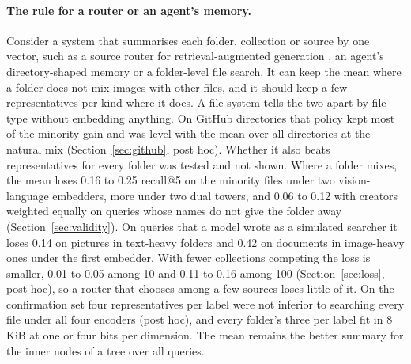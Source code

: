 \documentclass[sigconf,natbib=true,anonymous=true]{acmart}
\begin{document}
\paragraph{The rule for a router or an agent's memory.} Consider a system that summarises each folder, collection or source by one vector, such as a source router for retrieval-augmented generation \citep{dhasade2026ragroute}, an agent's directory-shaped memory or a folder-level file search. It can keep the mean where a folder does not mix images with other files, and it should keep a few representatives per kind where it does. A file system tells the two apart by file type without embedding anything. On GitHub directories that policy kept most of the minority gain and was level with the mean over all directories at the natural mix (Section~\ref{sec:github}, post hoc). Whether it also beats representatives for every folder was tested and not shown. Where a folder mixes, the mean loses 0.16 to 0.25 recall@5 on the minority files under two vision-language embedders, more under two dual towers, and 0.06 to 0.12 with creators weighted equally on queries whose names do not give the folder away (Section~\ref{sec:validity}). On queries that a model wrote as a simulated searcher it loses 0.14 on pictures in text-heavy folders and 0.42 on documents in image-heavy ones under the first embedder. With fewer collections competing the loss is smaller, 0.01 to 0.05 among 10 and 0.11 to 0.16 among 100 (Section~\ref{sec:loss}, post hoc), so a router that chooses among a few sources loses little of it. On the confirmation set four representatives per label were not inferior to searching every file under all four encoders (post hoc), and every folder's three per label fit in 8 KiB at one or four bits per dimension. The mean remains the better summary for the inner nodes of a tree over all queries.
\end{document}
